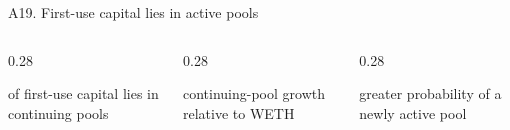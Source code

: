 \begin{frame}{A19. First-use capital lies in active pools}
\vspace{0.20cm}
\begin{columns}[T,totalwidth=0.92\textwidth]
\begin{column}{0.28\textwidth}
{\fontsize{24}{26}\selectfont\bfseries\color{stable}\BridgePoolMarginContinuingCapitalShare}\par
{\small of first-use capital lies in continuing pools\par}
\end{column}
\hfill
\begin{column}{0.28\textwidth}
{\fontsize{24}{26}\selectfont\bfseries\color{ucldark}\BridgePoolMarginContinuingDifference}\par
{\small continuing-pool growth relative to WETH\par}
\end{column}
\hfill
\begin{column}{0.28\textwidth}
{\fontsize{24}{26}\selectfont\bfseries\color{stable}\BridgePoolMarginNewPoolDifference}\par
{\small greater probability of a newly active pool\par}
\end{column}
\end{columns}
\end{frame}

